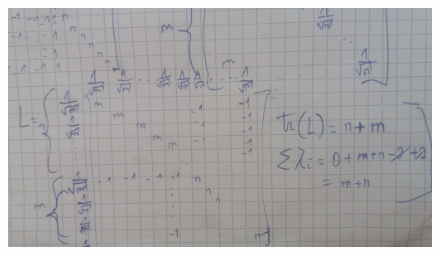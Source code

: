 \documentclass[14pt]{article}
\begin{document}
\begin{description}
\begin{figure}[h]
\end{figure}
\begin{figure}[h]
  \includegraphics[scale=0.3]{a10-ex1-c4.jpeg}
\end{figure}


\end{description}
\end{document}
